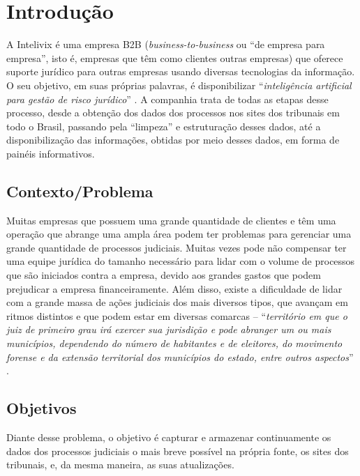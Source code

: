 \section{Introdução}
\label{sec:intro}
A Intelivix é uma empresa B2B (\textit{business-to-business} ou \enquote{de empresa para empresa}, isto é, empresas que têm como clientes outras empresas) que oferece suporte jurídico para outras empresas usando diversas tecnologias da informação. O seu objetivo, em suas próprias palavras, é disponibilizar \enquote{\textit{inteligência artificial para gestão de risco jurídico}} \cite{intelivix:2021}. A companhia trata de todas as etapas desse processo, desde a obtenção dos dados dos processos nos sites dos tribunais em todo o Brasil, passando pela \enquote{limpeza} e estruturação desses dados, até a disponibilização das informações, obtidas por meio desses dados, em forma de painéis informativos.

\subsection{Contexto/Problema}
\label{subsec:contexto}
Muitas empresas que possuem uma grande quantidade de clientes e têm uma operação que abrange uma ampla área podem ter problemas para gerenciar uma grande quantidade de processos judiciais. Muitas vezes pode não compensar ter uma equipe jurídica do tamanho necessário para lidar com o volume de processos que são iniciados contra a empresa, devido aos grandes gastos que podem prejudicar a empresa financeiramente. Além disso, existe a dificuldade de lidar com a grande massa de ações judiciais dos mais diversos tipos, que avançam em ritmos distintos e que podem estar em diversas comarcas – \enquote{\textit{território em que o juiz de primeiro grau irá exercer sua jurisdição e pode abranger um ou mais municípios, dependendo do número de habitantes e de eleitores, do movimento forense e da extensão territorial dos municípios do estado, entre outros aspectos}} \cite{cnj:comarca}.
 

\subsection{Objetivos}
\label{subsec:objetivos}
Diante desse problema, o objetivo é capturar e armazenar continuamente os dados dos processos judiciais o mais breve possível na própria fonte, os sites dos tribunais, e, da mesma maneira, as suas atualizações.

